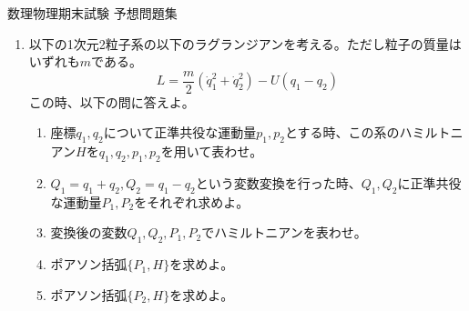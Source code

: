 \documentclass{jsarticle}
\begin{document}
\begin{center}
  {\huge 数理物理期末試験 予想問題集}\\
\end{center}

\begin{enumerate}
  \item 以下の1次元2粒子系の以下のラグランジアンを考える。ただし粒子の質量はいずれも$m$である。
        $$
          L = \frac{m}{2}(\dot{q}_1^2+\dot{q}_2^2) - U(q_1-q_2)
        $$
        この時、以下の問に答えよ。
        \begin{enumerate}
          \item 座標$q_1, q_2$について正準共役な運動量$p_1, p_2$とする時、この系のハミルトニアン$H$を$q_1, q_2, p_1, p_2$を用いて表わせ。
          \item $Q_1 = q_1 + q_2, Q_2 = q_1 - q_2$という変数変換を行った時、$Q_1, Q_2$に正準共役な運動量$P_1, P_2$をそれぞれ求めよ。
          \item 変換後の変数$Q_1, Q_2, P_1, P_2$でハミルトニアンを表わせ。
          \item ポアソン括弧$\{P_1, H\}$を求めよ。
          \item ポアソン括弧$\{P_2, H\}$を求めよ。
        \end{enumerate}

\end{enumerate}
\end{document}
